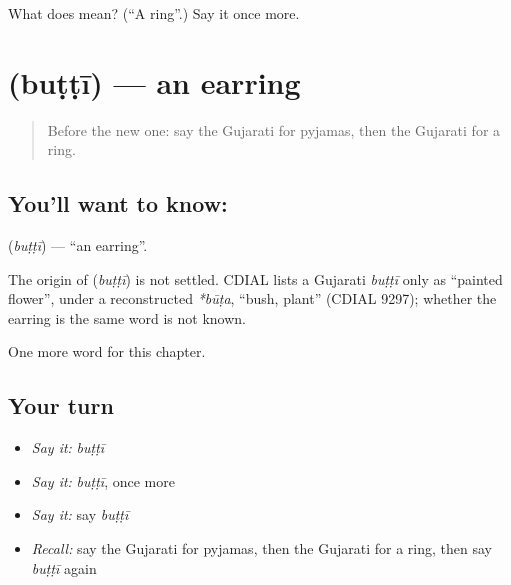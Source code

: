 \begin{tcolorbox}[breakable,colback=teal!4,colframe=teal!35!black,title={Before you move on}]
What does  mean? (\textquotedblleft{}A ring\textquotedblright{}.) Say it once more.
\end{tcolorbox}
\section[\texorpdfstring{\gu{બુટ્ટી} (buṭṭī)}{બુટ્ટી (buṭṭī)}]{ (buṭṭī) — an earring}

\label{lesson:GU-C111-butti}



\begin{quote}
Before the new one: say the Gujarati for pyjamas, then the Gujarati for a ring.
\end{quote}

\subsection*{You'll want to know: }
\textbf{} (\emph{buṭṭī}) — \textquotedblleft{}an earring\textquotedblright{}.

\begin{cousinweb}
The origin of \textbf{} (\emph{buṭṭī}) is not settled. CDIAL lists a Gujarati \emph{buṭṭī} only as \textquotedblleft{}painted flower\textquotedblright{}, under a reconstructed \emph{*būṭa}, \textquotedblleft{}bush, plant\textquotedblright{} (CDIAL 9297); whether the earring is the same word is not known.
\end{cousinweb}

\begin{grammarlens}[title={What you've built}]
One more word for this chapter.
\end{grammarlens}

\subsection*{Your turn}
\begin{itemize}
\raggedright
  \item \emph{Say it:} \emph{buṭṭī}
  \item \emph{Say it:} \emph{buṭṭī}, once more
  \item \emph{Say it:} say \emph{buṭṭī}
  \item \emph{Recall:} say the Gujarati for pyjamas, then the Gujarati for a ring, then say \emph{buṭṭī} again
\end{itemize}

